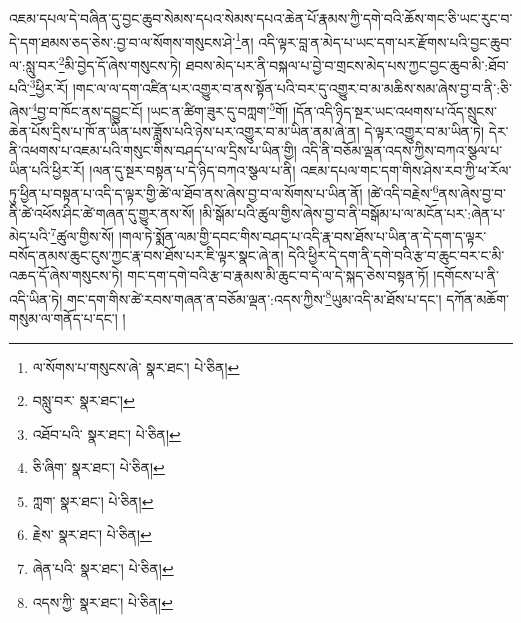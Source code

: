 འཇམ་དཔལ་དེ་བཞིན་དུ་བྱང་ཆུབ་སེམས་དཔའ་སེམས་དཔའ་ཆེན་པོ་རྣམས་ཀྱི་དགེ་བའི་ཆོས་གང་ཅི་ཡང་རུང་བ་དེ་དག་ཐམས་ཅད་ཅེས་:བྱ་བ་ལ་སོགས་གསུངས་ཤེ་\footnote{ལ་སོགས་པ་གསུངས་ཞེ་  སྣར་ཐང་།  པེ་ཅིན། }ན། འདི་ལྟར་བླ་ན་མེད་པ་ཡང་དག་པར་རྫོགས་པའི་བྱང་ཆུབ་ལ་:སླུ་བར་\footnote{བསླུ་བར་  སྣར་ཐང་། }མི་བྱེད་དོ་ཞེས་གསུངས་ཏེ། ཐབས་མེད་པར་ནི་བསྐལ་པ་བྱེ་བ་གྲངས་མེད་པས་ཀྱང་བྱང་ཆུབ་མི་:ཐོབ་པའི་\footnote{འཐོབ་པའི་  སྣར་ཐང་།  པེ་ཅིན། }ཕྱིར་རོ། །གང་ལ་ལ་དག་འཛིན་པར་འགྱུར་བ་ནས་སྟོན་པའི་བར་དུ་འགྱུར་བ་མ་མཆིས་སམ་ཞེས་བྱ་བ་ནི་:ཅི་ཞེས་\footnote{ཅི་ཞིག་  སྣར་ཐང་།  པེ་ཅིན། }བྱ་བ་ཁོང་ནས་དབྱུང་ངོ། །ཡང་ན་ཚིག་ཟུར་དུ་བཀླག་\footnote{ཀླག་  སྣར་ཐང་།  པེ་ཅིན། }གོ། །དོན་འདི་ཉིད་སྔར་ཡང་འཕགས་པ་འོད་སྲུངས་ཆེན་པོས་དྲིས་པ་ཁོ་ན་ཡིན་པས་ཟློས་པའི་ཉེས་པར་འགྱུར་བ་མ་ཡིན་ནམ་ཞེ་ན། དེ་ལྟར་འགྱུར་བ་མ་ཡིན་ཏེ། དེར་ནི་འཕགས་པ་འཇམ་པའི་གསུང་གིས་བཤད་པ་ལ་དྲིས་པ་ཡིན་གྱི། འདི་ནི་བཅོམ་ལྡན་འདས་ཀྱིས་བཀའ་སྩལ་པ་ཡིན་པའི་ཕྱིར་རོ། །ལན་དུ་སྔར་བསྟན་པ་དེ་ཉིད་བཀའ་སྩལ་པ་ནི། འཇམ་དཔལ་གང་དག་གིས་ཤེས་རབ་ཀྱི་ཕ་རོལ་ཏུ་ཕྱིན་པ་བསྟན་པ་འདི་ད་ལྟར་གྱི་ཚེ་ལ་ཐོབ་ནས་ཞེས་བྱ་བ་ལ་སོགས་པ་ཡིན་ནོ། །ཚེ་འདི་བརྗེས་\footnote{རྗེས་  སྣར་ཐང་།  པེ་ཅིན། }ནས་ཞེས་བྱ་བ་ནི་ཚེ་འཕོས་ཤིང་ཚེ་གཞན་དུ་གྱུར་ནས་སོ། །མི་སྒོམ་པའི་ཚུལ་གྱིས་ཞེས་བྱ་བ་ནི་བསྒོམ་པ་ལ་མངོན་པར་:ཞེན་པ་མེད་པའི་\footnote{ཞེན་པའི་  སྣར་ཐང་།  པེ་ཅིན། }ཚུལ་གྱིས་སོ། །གལ་ཏེ་སྨོན་ལམ་གྱི་དབང་གིས་བཤད་པ་འདི་རྣ་བས་ཐོས་པ་ཡིན་ན་དེ་དག་ད་ལྟར་བསོད་ནམས་ཆུང་ངུས་ཀྱང་རྣ་བས་ཐོས་པར་ཇི་ལྟར་སྣང་ཞེ་ན། དེའི་ཕྱིར་དེ་དག་ནི་དགེ་བའི་རྩ་བ་ཆུང་བར་ང་མི་འཆད་དོ་ཞེས་གསུངས་ཏེ། གང་དག་དགེ་བའི་རྩ་བ་རྣམས་མི་ཆུང་བ་དེ་ལ་དེ་སྐད་ཅེས་བསྟན་ཏོ། །དགོངས་པ་ནི་འདི་ཡིན་ཏེ། གང་དག་གིས་ཚེ་རབས་གཞན་ན་བཅོམ་ལྡན་:འདས་ཀྱིས་\footnote{འདས་ཀྱི་  སྣར་ཐང་།  པེ་ཅིན། }ཡུམ་འདི་མ་ཐོས་པ་དང་། དཀོན་མཆོག་གསུམ་ལ་གནོད་པ་དང་། །
